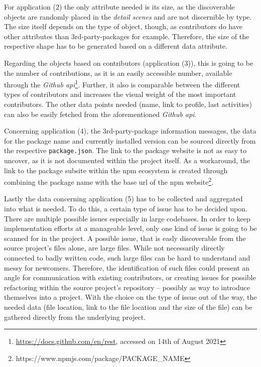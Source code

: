 For application (2) the only attribute needed is its size, as the discoverable objects are randomly placed in the \textit{detail scenes} and are not discernible by type. The size itself depends on the type of object, though, as contributors do have other attributes than 3rd-party-packages for example. Therefore, the size of the respective shape has to be generated based on a different data attribute.

Regarding the objects based on contributors (application (3)), this is going to be the number of contributions, as it is an easily accessible number, available through the \textit{Github \gls{api}}\footnote{\url{https://docs.github.com/en/rest}, accessed on 14th of August 2021}. Further, it also is comparable between the different types of contributors and increases the visual weight of the most important contributors. The other data points needed (name, link to profile, last activities) can also be easily fetched from the aforementioned \textit{Github \gls{api}}.

Concerning application (4), the 3rd-party-package information messages, the data for the package name and currently installed version can be sourced directly from the respective \verb|package.json|. The link to the package website is not as easy to uncover, as it is not documented within the project itself. As a workaround, the link to the package subsite within the \gls{npm} ecosystem is created through combining the package name with the base \gls{url} of the \gls{npm} website\footnote{https://www.npmjs.com/package/PACKAGE\_NAME}.

Lastly the data concerning application (5) has to be collected and aggregated into what is needed. To do this, a certain type of issue has to be decided upon. There are multiple possible issues especially in large codebases. In order to keep implementation efforts at a manageable level, only one kind of issue is going to be scanned for in the project. A possible issue, that is easly discoverable from the source project's files alone, are large files. While not necessarily directly connected to badly written code, such large files can be hard to understand and messy \cite{so2012large} for newcomers. Therefore, the identification of such files could present an angle for communication with existing contributors, or creating issues for possible refactoring within the source project's repository -- possibly as way to introduce themselves into a project. With the choice on the type of issue out of the way, the needed data (file location, link to the file location and the size of the file) can be gathered directly from the underlying project.

